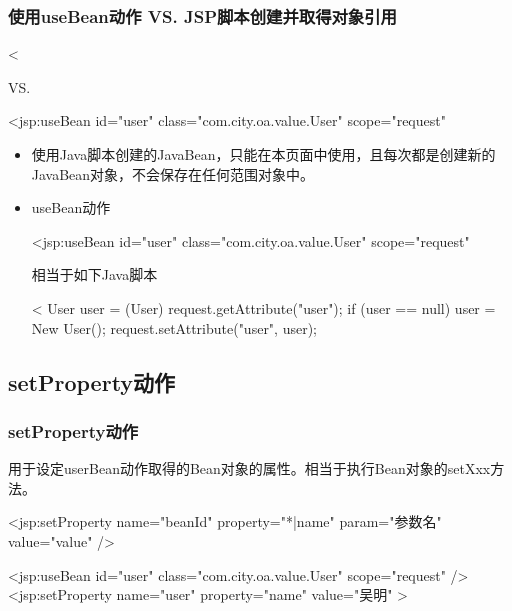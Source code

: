 \documentclass[compress,table]{beamer} %
\begin{document}
\begin{frame}[fragile] %
\frametitle{使用useBean动作 VS. JSP脚本创建并取得对象引用} 
\begin{jspCode}
<%
\end{jspCode}
{\centering VS.}
\begin{jspCode}
<jsp:useBean id="user" class="com.city.oa.value.User" scope="request" \>
\end{jspCode}
\begin{itemize}
\item 使用Java脚本创建的JavaBean，只能在本页面中使用，且每次都是创建新的JavaBean对象，不会保存在任何范围对象中。
\item useBean动作
  \begin{jspCode}
  <jsp:useBean id="user" class="com.city.oa.value.User" scope="request" \>    
  \end{jspCode}
  相当于如下Java脚本
  \begin{jspCode}
  <%
  User user = (User) request.getAttribute("user");
  if (user == null) {
    user = New User();
    request.setAttribute("user", user);
  }
  \end{jspCode}
\end{itemize}
\end{frame}

\subsection{setProperty动作} 
\begin{frame}[fragile] %
\frametitle{setProperty动作} 
用于设定userBean动作取得的Bean对象的属性。相当于执行Bean对象的setXxx方法。

\begin{jspCode}
<jsp:setProperty name="beanId" property="*|name" param="参数名" value="value" />
\end{jspCode}

\begin{jspCode}
<jsp:useBean id="user" class="com.city.oa.value.User" scope="request" />
<jsp:setProperty name="user" property="name" value="吴明" >
\end{jspCode}
\end{frame}
\end{document}
